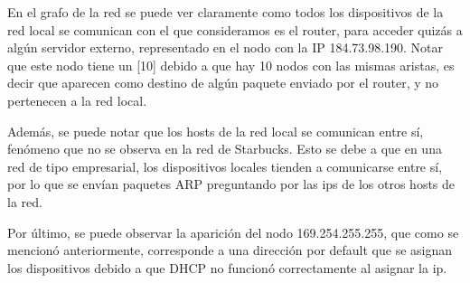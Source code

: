 En el grafo de la red se puede ver claramente como todos los dispositivos de la red local se comunican con el que consideramos es el router, para acceder quizás a algún servidor externo, representado en el nodo con la IP 184.73.98.190. Notar que este nodo tiene un [10] debido a que hay 10 nodos con las mismas aristas, es decir que aparecen como destino de algún paquete enviado por el router, y no pertenecen a la red local.

Además, se puede notar que los hosts de la red local se comunican entre sí, fenómeno que no se observa en la red de Starbucks. Esto se debe a que en una red de tipo empresarial, los dispositivos locales tienden a comunicarse entre sí, por lo que se envían paquetes ARP preguntando por las ips de los otros hosts de la red.

Por último, se puede observar la aparición del nodo 169.254.255.255, que como se mencionó anteriormente, corresponde a una dirección por default que se asignan los dispositivos debido a que DHCP no funcionó correctamente al asignar la ip.



